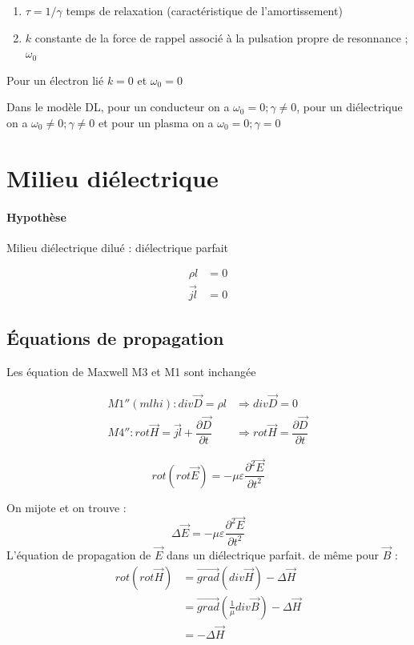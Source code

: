 \documentclass[12pt,a4paper]{report}
\begin{document}
\begin{enumerate}
	\item \(\tau = 1/\gamma\) temps de relaxation (caractéristique de l'amortissement)
	\item \(k\) constante de la force de rappel associé à la pulsation propre de resonnance ; \(\omega_0\)
\end{enumerate}
Pour un électron lié \(k = 0\) et \(\omega_0 = 0\)

Dans le modèle DL, pour un conducteur on a \(\omega_0 = 0; \gamma \neq 0\), pour un diélectrique on a \(\omega_0 \neq 0; \gamma \neq 0 \) et pour un plasma on a \(\omega_0 = 0; \gamma = 0\)

\section{Milieu diélectrique}

\paragraph{Hypothèse} Milieu diélectrique dilué : diélectrique parfait

\begin{align*}
	\rho l &= 0\\
	\vec	{jl} &= 0
\end{align*}

\subsection{Équations de propagation}

Les équation de Maxwell M3 et M1 sont inchangée

\begin{align*}
	M1''(mlhi) : div\vec{D} = \rho l &\Rightarrow div \vec{D} = 0\\
	M4'' : rot \vec{H} = \vec{jl} +  \dfrac{\partial \vec{D}}{\partial t} &\Rightarrow rot \vec{H} = \dfrac{\partial \vec{D}}{\partial t}
\end{align*}

\[
	rot (rot\vec{E}) = - \mu \varepsilon \dfrac{\partial^2 \vec{E}}{\partial t^2}
\]

On mijote et on trouve :
\[
	\Delta \vec{E} = - \mu \varepsilon \dfrac{\partial^2 \vec{E}}{\partial t^2}
\]
L'équation de propagation de \(\vec{E}\) dans un diélectrique parfait.
de même pour \(\vec{B}\) :
\begin{align*}
	rot (rot \vec{H}) &= \vec{grad} (div \vec{H}) - \Delta \vec{H}\\
	&= \vec{grad} (\frac{1}{\mu} div \vec{B}) - \Delta \vec{H}\\
	&= -\Delta \vec{H}
\end{align*}
\end{document}
